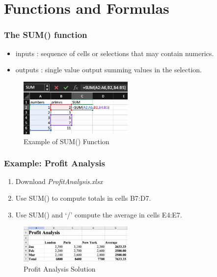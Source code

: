 \documentclass[12pt]{beamer}
\begin{document}
\section{Functions and Formulas}
	\begin{frame}
		\frametitle{The SUM() function}
		\begin{itemize}
			\item inputs : sequence of cells or selections that may contain numerics.
			\item outputs : single value output summing values in the selection. 
		\end{itemize}
	\begin{figure}
		\begin{center}
			\includegraphics[width=0.5\textwidth]{SUMex.png}
		\end{center}
		\caption{Example of SUM() Function}		
	\end{figure}
	\end{frame}
	\begin{frame}
		\frametitle{Example: Profit Analysis}
		\begin{enumerate}
			\item Download \textit{ProfitAnalysis.xlsx}
			\item Use SUM() to compute totals in cells B7:D7.
			\item Use SUM() and `/' compute the average in cells E4:E7. 
		\end{enumerate}
		\begin{figure}
			\begin{center}
				\includegraphics[width=0.5\textwidth]{ProfitAnalysisEx.png}
			\end{center}
			\caption{Profit Analysis Solution}
		\end{figure}
	\end{frame}
\end{document}
